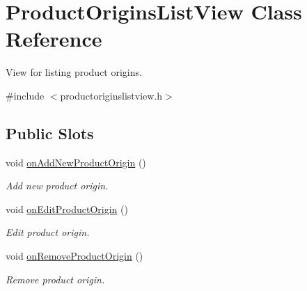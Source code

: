 \hypertarget{class_product_origins_list_view}{\section{\-Product\-Origins\-List\-View \-Class \-Reference}
\label{class_product_origins_list_view}
}


\-View for listing product origins.  




{\ttfamily \#include $<$productoriginslistview.\-h$>$}

\subsection*{\-Public \-Slots}
\begin{DoxyCompactItemize}
\item 
void \hyperlink{class_product_origins_list_view_a7bfa23af51a82b0bae24a483daee7f91}{on\-Add\-New\-Product\-Origin} ()
\begin{DoxyCompactList}\small\item\em \-Add new product origin. \end{DoxyCompactList}\item 
void \hyperlink{class_product_origins_list_view_a407d81c3fd1c7b11e0200197607cacd8}{on\-Edit\-Product\-Origin} ()
\begin{DoxyCompactList}\small\item\em \-Edit product origin. \end{DoxyCompactList}\item 
void \hyperlink{class_product_origins_list_view_a06b608fb3ffc7aad40f160a511638501}{on\-Remove\-Product\-Origin} ()
\begin{DoxyCompactList}\small\item\em \-Remove product origin. \end{DoxyCompactList}\end{DoxyCompactItemize}
